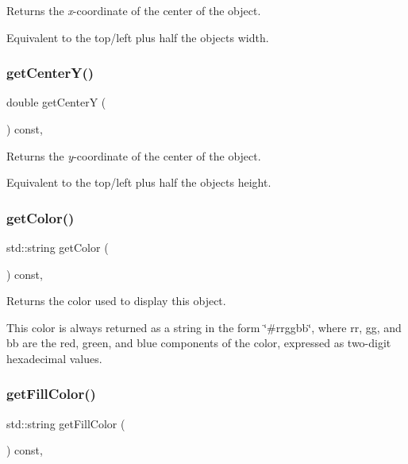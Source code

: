 Returns the {\itshape x}-\/coordinate of the center of the object. 

Equivalent to the top/left plus half the object\textquotesingle{}s width. \mbox{\label{classGObject_acb3287a3d507025a26f54b895713b947}} 
\subsubsection{\texorpdfstring{get\+Center\+Y()}{getCenterY()}}
{\footnotesize\ttfamily double get\+CenterY (\begin{DoxyParamCaption}{ }\end{DoxyParamCaption}) const\hspace{0.3cm}{\ttfamily [virtual]}, {\ttfamily [inherited]}}



Returns the {\itshape y}-\/coordinate of the center of the object. 

Equivalent to the top/left plus half the object\textquotesingle{}s height. \mbox{\label{classGObject_aa061dfa488c31e18549d64363c1d0e34}} 
\subsubsection{\texorpdfstring{get\+Color()}{getColor()}}
{\footnotesize\ttfamily std\+::string get\+Color (\begin{DoxyParamCaption}{ }\end{DoxyParamCaption}) const\hspace{0.3cm}{\ttfamily [virtual]}, {\ttfamily [inherited]}}



Returns the color used to display this object. 

This color is always returned as a string in the form {\ttfamily \char`\"{}\#rrggbb\char`\"{}}, where {\ttfamily rr}, {\ttfamily gg}, and {\ttfamily bb} are the red, green, and blue components of the color, expressed as two-\/digit hexadecimal values. \mbox{\label{classGObject_a76f6964a11fde7c78e9751be184e1a3c}} 
\subsubsection{\texorpdfstring{get\+Fill\+Color()}{getFillColor()}}
{\footnotesize\ttfamily std\+::string get\+Fill\+Color (\begin{DoxyParamCaption}{ }\end{DoxyParamCaption}) const\hspace{0.3cm}{\ttfamily [virtual]}, {\ttfamily [inherited]}}



